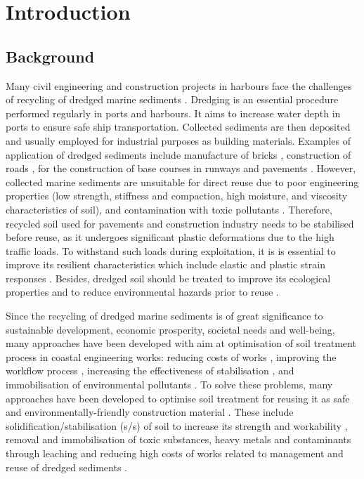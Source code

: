 \documentclass[information,article,submit,pdftex,moreauthors]{Definitions/mdpi}
\begin{document}
\section{Introduction}

\subsection{Background}

Many civil engineering and construction projects in harbours face the challenges of recycling of dredged marine sediments \cite{LIM2020110869,Lindh202208,Wangetal2022}. Dredging is an essential procedure performed regularly in ports and harbours. It aims to increase water depth in ports to ensure safe ship transportation. Collected sediments are then deposited and usually employed for industrial purposes as building materials. Examples of application of dredged sediments include manufacture of bricks \cite{HUSSAIN2022100046,SLIMANOU2020101085}, construction of roads \cite{Wangetal2017}, for the construction of base courses in runways and pavements \cite{Yoobanpot}. However, collected marine sediments are unsuitable for direct reuse due to poor engineering properties (low strength, stiffness and compaction, high moisture, and viscosity characteristics of soil), and contamination with toxic pollutants \cite{Calmano1986,Pedersen}. Therefore, recycled soil used for pavements and construction industry needs to be stabilised before reuse, as it undergoes significant plastic deformations due to the high traffic loads. To withstand such loads during exploitation, it is  is essential to improve its resilient characteristics which include elastic and plastic strain responses \cite{Puppala}. Besides, dredged soil should be treated to improve its ecological properties and to reduce environmental hazards prior to reuse \cite{CROCETTI202220}. 

Since the recycling of dredged marine sediments is of great significance to sustainable development, economic prosperity, societal needs  and well-being, many approaches have been developed with aim at optimisation of soil treatment process in coastal engineering works: reducing costs of works \cite{SVENSSON202230}, improving the workflow process \cite{Grubbetal2008}, increasing the effectiveness of stabilisation \cite{YU2021125568,Dermatas}, and immobilisation of environmental pollutants \cite{Wangetal2021}. To solve these problems, many approaches have been developed to optimise soil treatment for reusing it as safe and environmentally-friendly construction material \cite{Calmano1988}. These include solidification/stabilisation (s/s) of soil to increase its strength and workability \cite{ZHANG2020138551}, removal and immobilisation of toxic substances, heavy metals and contaminants through leaching \cite{SLAMA2021127,Lemenkova202233,ZHANG2021128926,CHI2023131545} and reducing high costs of works related to management and reuse of dredged sediments \cite{Rocha,WANG201869}. 
\end{document}
